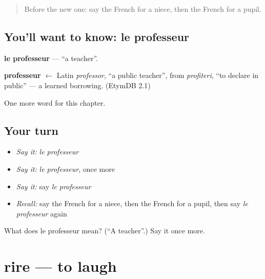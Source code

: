 \label{lesson:FR-C59-professeur}



\begin{quote}
Before the new one: say the French for a niece, then the French for a pupil.
\end{quote}

\subsection*{You'll want to know: le professeur}
\textbf{le professeur} — \textquotedblleft{}a teacher\textquotedblright{}.

\begin{cousinweb}
\textbf{professeur} $\leftarrow$ Latin \emph{professor}, \textquotedblleft{}a public teacher\textquotedblright{}, from \emph{profiteri}, \textquotedblleft{}to declare in public\textquotedblright{} — a learned borrowing. (EtymDB 2.1)
\end{cousinweb}

\begin{grammarlens}[title={What you've built}]
One more word for this chapter.
\end{grammarlens}

\subsection*{Your turn}
\begin{itemize}
\raggedright
  \item \emph{Say it:} \emph{le professeur}
  \item \emph{Say it:} \emph{le professeur}, once more
  \item \emph{Say it:} say \emph{le professeur}
  \item \emph{Recall:} say the French for a niece, then the French for a pupil, then say \emph{le professeur} again
\end{itemize}

\begin{tcolorbox}[breakable,colback=teal!4,colframe=teal!35!black,title={Before you move on}]
What does le professeur mean? (\textquotedblleft{}A teacher\textquotedblright{}.) Say it once more.
\end{tcolorbox}
\section[rire]{rire — to laugh}

\label{lesson:FR-C59-rire}



